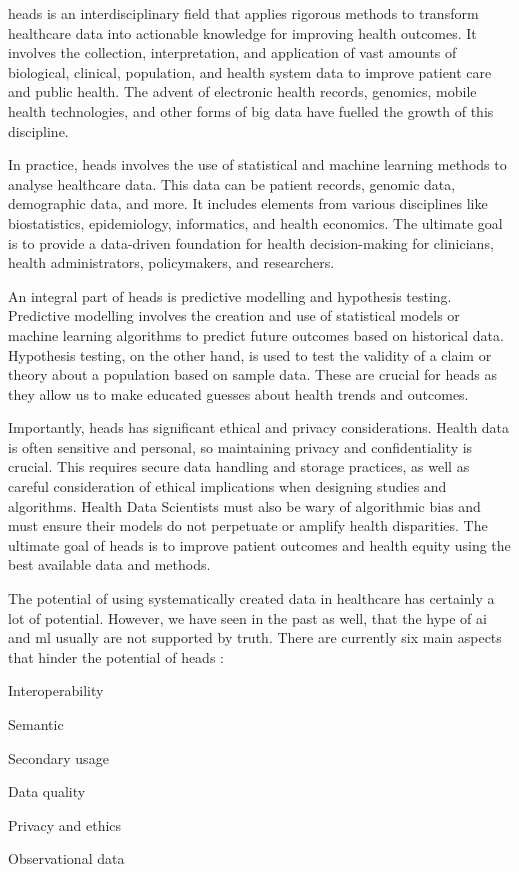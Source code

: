 
\ac{heads} is an interdisciplinary field that applies rigorous methods to transform healthcare data into actionable knowledge for improving health outcomes. It involves the collection, interpretation, and application of vast amounts of biological, clinical, population, and health system data to improve patient care and public health. The advent of electronic health records, genomics, mobile health technologies, and other forms of big data have fuelled the growth of this discipline.

In practice, \ac{heads} involves the use of statistical and machine learning methods to analyse healthcare data. This data can be patient records, genomic data, demographic data, and more. It includes elements from various disciplines like biostatistics, epidemiology, informatics, and health economics. The ultimate goal is to provide a data-driven foundation for health decision-making for clinicians, health administrators, policymakers, and researchers.

An integral part of \ac{heads} is predictive modelling and hypothesis testing. Predictive modelling involves the creation and use of statistical models or machine learning algorithms to predict future outcomes based on historical data. Hypothesis testing, on the other hand, is used to test the validity of a claim or theory about a population based on sample data. These are crucial for \ac{heads} as they allow us to make educated guesses about health trends and outcomes.

Importantly, \ac{heads} has significant ethical and privacy considerations. Health data is often sensitive and personal, so maintaining privacy and confidentiality is crucial. This requires secure data handling and storage practices, as well as careful consideration of ethical implications when designing studies and algorithms. Health Data Scientists must also be wary of algorithmic bias and must ensure their models do not perpetuate or amplify health disparities. The ultimate goal of \ac{heads} is to improve patient outcomes and health equity using the best available data and methods.


The potential of using systematically created data in healthcare has certainly a lot of potential. However, we have seen in the past as well, that the hype of \ac{ai} and \ac{ml} usually are not supported by truth. There are currently six main aspects that hinder the potential of \ac{heads} \cite{panchInconvenientTruthAI2019,peekThreeControversiesHealth2018}:
\begin{myitemize}
    \item Interoperability
    \item Semantic
    \item Secondary usage
    \item Data quality
    \item Privacy and ethics
    \item Observational data
\end{myitemize}

